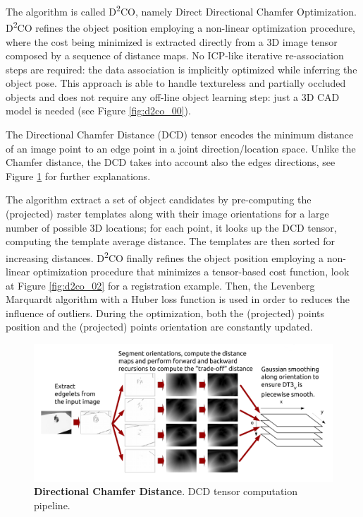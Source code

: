 The algorithm is called D\textsuperscript{2}{CO}, namely Direct Directional Chamfer Optimization. D\textsuperscript{2}CO refines the object position employing a non-linear optimization procedure, where the cost being minimized is extracted directly from a 3D image tensor composed by a sequence of distance maps. No ICP-like iterative re-association steps are required: the data association is implicitly optimized while inferring the object pose. This approach is able to handle textureless and partially occluded objects and does not require any off-line object learning step: just a 3D CAD model is needed (see Figure \ref{fig:d2co_00}).

The Directional Chamfer Distance (DCD) tensor encodes the minimum distance of an image point to an edge point in a joint direction/location space. Unlike the Chamfer distance, the DCD takes into account also the edges directions, see Figure \ref{fig:d2co_01} for further explanations.

The algorithm extract a set of object candidates by pre-computing the (projected) raster templates along with their image orientations for a large number of possible 3D locations; for each point, it looks up the DCD tensor, computing the template average distance. The templates are then sorted for increasing distances. D\textsuperscript{2}CO finally refines the object position employing a non-linear optimization procedure that minimizes a tensor-based cost function, look at Figure \ref{fig:d2co_02} for a registration example. Then, the Levenberg Marquardt algorithm with a Huber loss function is used in order to reduces the influence of outliers. During the optimization, both the (projected) points position and the (projected) points orientation are constantly updated.

\begin{figure}
    \centering
    \includegraphics[width=\textwidth]{figures/1_perception_and_sensing_in_robotics/d2co_01}
    \caption{\textbf{Directional Chamfer Distance}. DCD tensor computation pipeline.} 
    \label{fig:d2co_01}
\end{figure}

